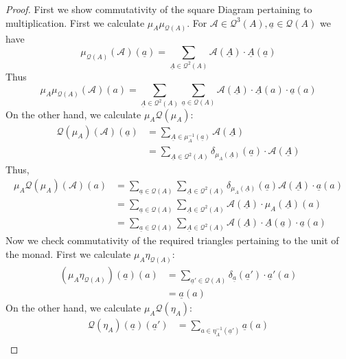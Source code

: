\documentclass[12pt]{article}
\theoremstyle{plain}
\theoremstyle{definition}
\newcommand{\scr}[1]{\mathscr{#1}}
\newcommand{\call}[1]{\mathcal{#1}}
\begin{document}
\begin{proof}
First we show commutativity of the square Diagram pertaining to multiplication. First we calculate $\mu_A \mu _{\call{Q}(A)}$. For $\scr{A} \in \call{Q}^3(A), \underline{a} \in \call{Q}(A)$ we have
\begin{equation}
	\mu_{\call{Q}(A)}(\scr{A})(\underline{a}) = \sum_{\underline{A} \in \call{Q}^2(A)}\scr{A}(\underline{A})\cdot \underline{A}(\underline{a})
\end{equation}
Thus
\begin{equation}
	\mu_A\mu_{\call{Q}(A)}(\scr{A})(a) = \sum_{\underline{A} \in \call{Q}^2(A)} \sum_{\underline{a} \in \call{Q}(A)}\scr{A}(\underline{A})\cdot \underline{A}(a) \cdot \underline{a}(a)
\end{equation}
On the other hand, we calculate $\mu_A \call{Q}(\mu_A)$:
\begin{align*}
	\call{Q}(\mu_A)(\scr{A})(\underline{a}) &= \sum_{\underline{A} \in \mu_{A}^{-1}(\underline{a})}\scr{A}(\underline{A})\\
	&= \sum_{\underline{A} \in \call{Q}^2(A)}\delta_{\mu_A(\underline{A})}(\underline{a})\cdot \scr{A}(\underline{A})
\end{align*}
Thus,
\begin{align*}
	\mu_A \call{Q}(\mu_A)(\scr{A})(a) &= \sum_{\underline{a} \in \call{Q}(A)}\sum_{\underline{A} \in \call{Q}^2(A)}\delta_{\mu_A(\underline{A})}(\underline{a})\scr{A}(\underline{A})\cdot \underline{a}(a)\\
	&= \sum_{\underline{a} \in \call{Q}(A)}\sum_{\underline{A} \in \call{Q}^2(A)}\scr{A}(\underline{A}) \cdot \mu_A(\underline{A})(a)\\
	&= \sum_{\underline{a} \in \call{Q}(A)}\sum_{\underline{A} \in \call{Q}^2(A)}\scr{A}(\underline{A}) \cdot \underline{A}(\underline{a}) \cdot \underline{a}(a)
\end{align*}
Now we check commutativity of the required triangles pertaining to the unit of the monad.
First we calculate $\mu_A \eta_{\call{Q}(A)}$:
\begin{align*}
	(\mu_A\eta_{\call{Q}(A)})(\underline{a})(a) &= \sum_{\underline{a}' \in \call{Q}(A)}\delta_{\underline{a}}(\underline{a}')\cdot \underline{a}'(a)\\
	&= \underline{a}(a)
\end{align*}
On the other hand, we calculate $\mu_A \call{Q}(\eta_A)$:
\begin{align*}
	\call{Q}(\eta_A)(\underline{a})(\underline{a}') &= \sum_{a \in \eta_A^{-1}(\underline{a}')}\underline{a}(a)\\

\end{align*}
\end{proof}
\end{document}
